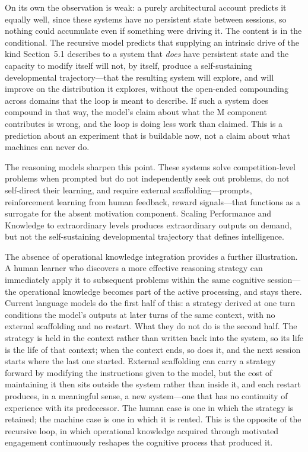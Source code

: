 \documentclass[12pt,a4paper]{article}
\begin{document}
On its own the observation is weak: a purely architectural account predicts it equally well, since these systems have no persistent state between sessions, so nothing could accumulate even if something were driving it. The content is in the conditional. The recursive model predicts that supplying an intrinsic drive of the kind Section~5.1 describes to a system that \emph{does} have persistent state and the capacity to modify itself will not, by itself, produce a self-sustaining developmental trajectory---\hspace{0pt}that the resulting system will explore, and will improve on the distribution it explores, without the open-ended compounding across domains that the loop is meant to describe. If such a system does compound in that way, the model's claim about what the M component contributes is wrong, and the loop is doing less work than claimed. This is a prediction about an experiment that is buildable now, not a claim about what machines can never do.

The reasoning models sharpen this point. These systems solve competition-level problems when prompted but do not independently seek out problems, do not self-direct their learning, and require external scaffolding---\hspace{0pt}prompts, reinforcement learning from human feedback, reward signals---\hspace{0pt}that functions as a surrogate for the absent motivation component. Scaling Performance and Knowledge to extraordinary levels produces extraordinary outputs on demand, but not the self-sustaining developmental trajectory that defines intelligence.

The absence of operational knowledge integration provides a further illustration. A human learner who discovers a more effective reasoning strategy can immediately apply it to subsequent problems within the same cognitive session---\hspace{0pt}the operational knowledge becomes part of the active processing, and stays there. Current language models do the first half of this: a strategy derived at one turn conditions the model's outputs at later turns of the same context, with no external scaffolding and no restart. What they do not do is the second half. The strategy is held in the context rather than written back into the system, so its life is the life of that context; when the context ends, so does it, and the next session starts where the last one started. External scaffolding can carry a strategy forward by modifying the instructions given to the model, but the cost of maintaining it then sits outside the system rather than inside it, and each restart produces, in a meaningful sense, a new system---\hspace{0pt}one that has no continuity of experience with its predecessor. The human case is one in which the strategy is retained; the machine case is one in which it is rented. This is the opposite of the recursive loop, in which operational knowledge acquired through motivated engagement continuously reshapes the cognitive process that produced it.
\end{document}
